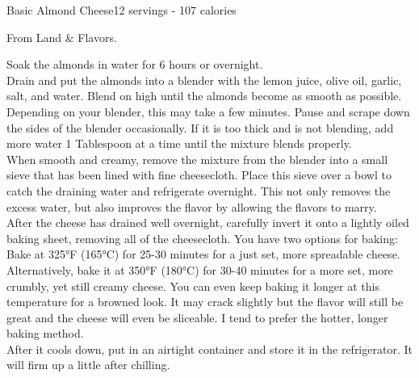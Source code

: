 \begin{recipe}{Basic Almond Cheese}{12 servings - 107 calories}{}

\freeform From Land \& Flavors.


Soak the almonds in water for 6 hours or overnight.\\

Drain and put the almonds into a blender with the lemon juice, olive oil, garlic, salt, and water.
Blend on high until the almonds become as smooth as possible. Depending on your blender, this may take a few minutes. Pause and scrape down the sides of the blender occasionally. If it is too thick and is not blending, add more water 1 Tablespoon at a time until the mixture blends properly.\\

When smooth and creamy, remove the mixture from the blender into a small sieve that has been lined with fine cheesecloth. Place this sieve over a bowl to catch the draining water and refrigerate overnight. This not only removes the excess water, but also improves the flavor by allowing the flavors to marry.\\

After the cheese has drained well overnight, carefully invert it onto a lightly oiled baking sheet, removing all of the cheesecloth. You have two options for baking: Bake at 325°F (165°C) for 25-30 minutes for a just set, more spreadable cheese. Alternatively, bake it at 350°F (180°C) for 30-40 minutes for a more set, more crumbly, yet still creamy cheese. You can even keep baking it longer at this temperature for a browned look. It may crack slightly but the flavor will still be great and the cheese will even be sliceable. I tend to prefer the hotter, longer baking method.\\

After it cools down, put in an airtight container and store it in the refrigerator. It will firm up a little after chilling.

\end{recipe}
